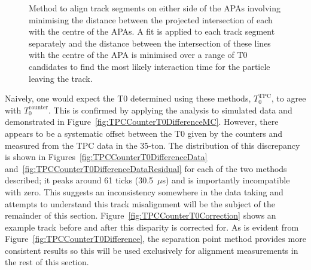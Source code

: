 \begin{figure}
\begin{subfigure}[t]{0.48\linewidth}
  \end{subfigure}
  \caption[Method to align track segments on either side of the APAs involving minimising the distance between the projected intersection of each with the centre of the APAs.]{Method to align track segments on either side of the APAs involving minimising the distance between the projected intersection of each with the centre of the APAs.  A fit is applied to each track segment separately and the distance between the intersection of these lines with the centre of the APA is minimised over a range of T0 candidates to find the most likely interaction time for the particle leaving the track.}
  \label{fig:APACrossingAlignmentSeparation}
\end{figure}

Naively, one would expect the T0 determined using these methods, $T_0^{\mathrm{TPC}}$, to agree with $T_0^{\mathrm{counter}}$.  This is confirmed by applying the analysis to simulated data and demonstrated in Figure~\ref{fig:TPCCounterT0DifferenceMC}.  However, there appears to be a systematic offset between the T0 given by the counters and measured from the TPC data in the 35-ton.  The distribution of this discrepancy is shown in Figures~\ref{fig:TPCCounterT0DifferenceData} and~\ref{fig:TPCCounterT0DifferenceDataResidual} for each of the two methods described; it peaks around 61 ticks (30.5~$\mu$s) and is importantly incompatible with zero.  This suggests an inconsistency somewhere in the data taking and attempts to understand this track misalignment will be the subject of the remainder of this section.  Figure~\ref{fig:TPCCounterT0Correction} shows an example track before and after this disparity is corrected for.  As is evident from Figure~\ref{fig:TPCCounterT0Difference}, the separation point method provides more consistent results so this will be used exclusively for alignment measurements in the rest of this section.

